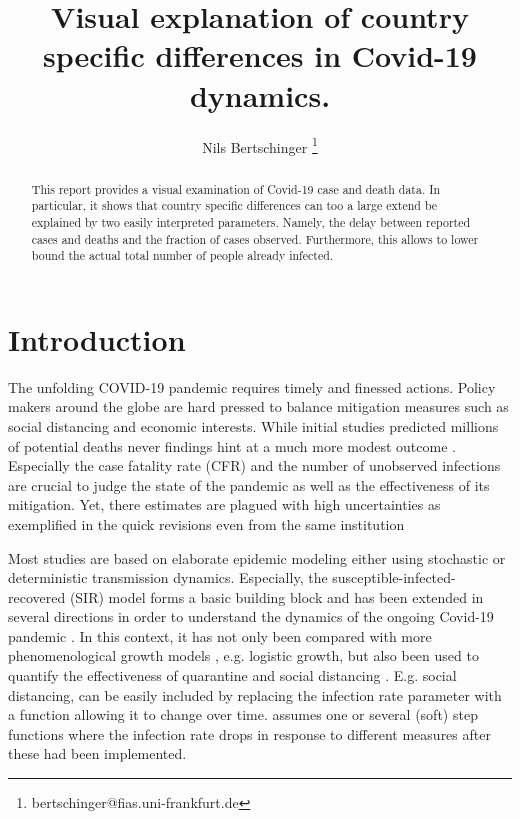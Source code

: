 \documentclass[fullpage,a4paper]{article}
\title{Visual explanation of country specific differences in
  Covid-19 dynamics.}
\author[1,2]{Nils Bertschinger \thanks{bertschinger@fias.uni-frankfurt.de}}
\affil[1]{Department of Systemic Risk, Frankfurt Institute for Advanced Studies, Frankfurt am Main, Germany}
\affil[2]{Department of Computer Science, Goethe University, Frankfurt am Main, Germany}
\begin{document}
\maketitle%

\begin{abstract}
  This report provides a visual examination of Covid-19 case and death
  data. In particular, it shows that country specific differences can
  too a large extend be explained by two easily interpreted
  parameters. Namely, the delay between reported cases and deaths and
  the fraction of cases observed. Furthermore, this allows to lower
  bound the actual total number of people already infected.
\end{abstract}

\section{Introduction}

The unfolding COVID-19 pandemic requires timely and finessed
actions. Policy makers around the globe are hard pressed to balance
mitigation measures such as social distancing and economic
interests. While initial studies \cite{imperial1} predicted millions
of potential deaths never findings hint at a much more modest outcome
\cite{Lourenco2020.03.24.20042291,imperial2}. Especially the case
fatality rate (CFR) and the number of unobserved infections are
crucial to judge the state of the pandemic as well as the
effectiveness of its mitigation. Yet, there estimates are plagued with
high uncertainties as exemplified in the quick revisions even from the
same institution \cite{imperial1,imperial2}

Most studies are based on elaborate epidemic modeling either using
stochastic or deterministic transmission dynamics. Especially, the
susceptible-infected-recovered (SIR) model \cite{Newman} forms a
basic building block and has been extended in several directions in
order to understand the dynamics of the ongoing Covid-19 pandemic
\cite{arxiv:2002.07572,arxiv:2004.01105,10.1126/science.abb3221,https://www.medrxiv.org/content/10.1101/2020.02.27.20028639v2}.
In this context, it has not only been compared with more
phenomenological growth models
\cite{https://doi.org/10.1101/2020.03.12.20034595}, e.g. logistic
growth, but also been used to quantify the effectiveness of quarantine
and social distancing \cite{arxiv:2002.07572,arxiv:2004.01105}.
E.g. social distancing, can be easily included by replacing the
infection rate parameter with a function allowing it to change over
time. \cite{arxiv:2004.01105} assumes one or several (soft) step
functions where the infection rate drops in response to different
measures after these had been implemented.
\end{document}
